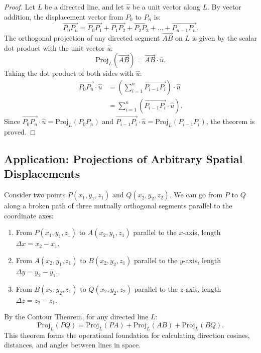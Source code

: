 \begin{proof}
Let $L$ be a directed line, and let $\hat{u}$ be a unit vector along $L$.
By vector addition, the displacement vector from $P_0$ to $P_n$ is:
\begin{equation}
    \vec{P_0 P_n} = \vec{P_0 P_1} + \vec{P_1 P_2} + \vec{P_2 P_3} + \dots + \vec{P_{n-1} P_n}.
\end{equation}
The orthogonal projection of any directed segment $\vec{AB}$ on $L$ is given by the scalar dot product with the unit vector $\hat{u}$:
\begin{equation}
    \text{Proj}_L(\vec{AB}) = \vec{AB} \cdot \hat{u}.
\end{equation}
Taking the dot product of both sides with $\hat{u}$:
\begin{align}
    \vec{P_0 P_n} \cdot \hat{u} &= \left( \sum_{i=1}^n \vec{P_{i-1} P_i} \right) \cdot \hat{u} \nonumber\\
    &= \sum_{i=1}^n (\vec{P_{i-1} P_i} \cdot \hat{u}).
\end{align}
Since $\vec{P_0 P_n} \cdot \hat{u} = \text{Proj}_L(P_0 P_n)$ and $\vec{P_{i-1} P_i} \cdot \hat{u} = \text{Proj}_L(P_{i-1} P_i)$, the theorem is proved.
\end{proof}

\subsection{Application: Projections of Arbitrary Spatial Displacements}
Consider two points $P(x_1, y_1, z_1)$ and $Q(x_2, y_2, z_2)$. We can go from $P$ to $Q$ along a broken path of three mutually orthogonal segments parallel to the coordinate axes:
\begin{enumerate}[noitemsep]
    \item From $P(x_1, y_1, z_1)$ to $A(x_2, y_1, z_1)$ parallel to the $x$-axis, length $\Delta x = x_2 - x_1$.
    \item From $A(x_2, y_1, z_1)$ to $B(x_2, y_2, z_1)$ parallel to the $y$-axis, length $\Delta y = y_2 - y_1$.
    \item From $B(x_2, y_2, z_1)$ to $Q(x_2, y_2, z_2)$ parallel to the $z$-axis, length $\Delta z = z_2 - z_1$.
\end{enumerate}
By the Contour Theorem, for any directed line $L$:
\begin{equation}
    \text{Proj}_L(PQ) = \text{Proj}_L(PA) + \text{Proj}_L(AB) + \text{Proj}_L(BQ).
\end{equation}
This theorem forms the operational foundation for calculating direction cosines, distances, and angles between lines in space.


